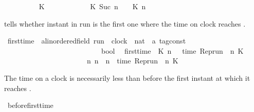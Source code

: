 \begin{isabellebody}
\ \ {\isacharparenleft}{\isacartoucheopen}{\isacharhash}\isactrlsub {\isacharless}\ {\isacharunderscore}\ {\isacharunderscore}\ {\isacharunderscore}{\isacartoucheclose}{\isacharparenright}\isanewline
{}\isanewline
\ \ {\isacartoucheopen}{\isacharparenleft}{\isacharhash}\isactrlsub {\isacharless}\ {\isasymrho}\ K\ {}{\isacharparenright}\ \ \ \ \ \ \ {\isacharequal}\ {}{\isacartoucheclose}\isanewline
{\isacharbar}\ {\isacartoucheopen}{\isacharparenleft}{\isacharhash}\isactrlsub {\isacharless}\ {\isasymrho}\ K\ {\isacharparenleft}Suc\ n{\isacharparenright}{\isacharparenright}\ {\isacharequal}\ {\isacharhash}\isactrlsub {\isasymle}\ {\isasymrho}\ K\ n{\isacartoucheclose}%
\begin{isamarkuptext}%
 tells whether instant  in run \isa{{\isasymrho}}
  is the first one where the time on clock  reaches \isa{{\isasymtau}}.%
\end{isamarkuptext}\isamarkuptrue%
\isamarkupfalse%
\ first{\isacharunderscore}time\ {\isacharcolon}{\isacharcolon}\ {\isacartoucheopen}{\isacharprime}a{\isacharcolon}{\isacharcolon}linordered{\isacharunderscore}field\ run\ {\isasymRightarrow}\ clock\ {\isasymRightarrow}\ nat\ {\isasymRightarrow}\ {\isacharprime}a\ tag{\isacharunderscore}const\isanewline
\ \ \ \ \ \ \ \ \ \ \ \ \ \ \ \ \ \ \ \ \ \ \ \ \ \ {\isasymRightarrow}\ bool{\isacartoucheclose}\isanewline
{}\isanewline
\ \ {\isacartoucheopen}first{\isacharunderscore}time\ {\isasymrho}\ K\ n\ {\isasymtau}\ {\isasymequiv}\ {\isacharparenleft}time\ {\isacharparenleft}{\isacharparenleft}Rep{\isacharunderscore}run\ {\isasymrho}{\isacharparenright}\ n\ K{\isacharparenright}\ {\isacharequal}\ {\isasymtau}{\isacharparenright}\isanewline
\ \ \ \ \ \ \ \ \ \ \ \ \ \ \ \ \ \ \ \ \ \ {\isasymand}\ {\isacharparenleft}{\isasymnexists}n{\isacharprime}{\isachardot}\ n{\isacharprime}\ {\isacharless}\ n\ {\isasymand}\ time\ {\isacharparenleft}{\isacharparenleft}Rep{\isacharunderscore}run\ {\isasymrho}{\isacharparenright}\ n{\isacharprime}\ K{\isacharparenright}\ {\isacharequal}\ {\isasymtau}{\isacharparenright}{\isacartoucheclose}%
\begin{isamarkuptext}%
The time on a clock is necessarily less than \isa{{\isasymtau}} before the first instant
  at which it reaches \isa{{\isasymtau}}.%
\end{isamarkuptext}\isamarkuptrue%
\isamarkupfalse%
\ before{\isacharunderscore}first{\isacharunderscore}time{\isacharcolon}\isanewline

\end{isabellebody}
